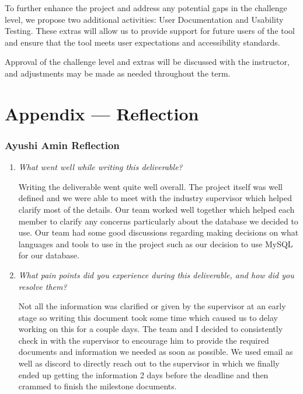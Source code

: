 \documentclass{article}
\begin{document}
To further enhance the project and address any potential gaps in the challenge level, 
we propose two additional activities: User Documentation and Usability Testing. 
These extras will allow us to provide support for future users of the tool and 
ensure that the tool meets user expectations and accessibility standards. 

Approval of the challenge level and extras will be discussed with the instructor, 
and adjustments may be made as needed throughout the term.

\newpage{}

\section*{Appendix --- Reflection}




\subsubsection*{Ayushi Amin Reflection}

\begin{enumerate}
    \item \textit{What went well while writing this deliverable?}
    
      Writing the deliverable went quite well overall. The project itself was well defined and we were able to meet with the industry supervisor which helped clarify most of the details. Our team worked well together which helped each member to clarify any concerns particularly about the database we decided to use. Our team had some good discussions regarding making decisions on  what languages and tools to use in the project such as our decision to use MySQL for our database.

    \item \textit{What pain points did you experience during this deliverable, and how did you resolve them?}
    
    Not all the information was clarified or given by the supervisor at an early stage so writing this document took some time which caused us to delay working on this for a couple days. The team and I decided to consistently check in with the supervisor to encourage him to provide the required documents and information we needed as soon as possible. We used email as well as discord to directly reach out to the supervisor in which we finally ended up getting the information 2 days before the deadline and then crammed to finish the milestone documents.
    
\end{enumerate}  
\end{document}
